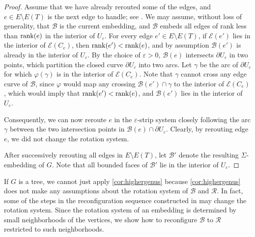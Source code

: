 \documentclass[a4paper,USenglish,cleveref,colorlinks=true,urlcolor=black,linkcolor=black,citecolor=black,thm-restate,authorcolumns]{lipics-v2021}
\theoremstyle{claimstyle}
\begin{document}
\begin{proof}
    Assume that we have already rerouted some of the edges, and $e\in E\setminus E(T)$ is the next edge to handle; see .
    We may assume, without loss of generality, that $\mathcal{B}$ is the current embedding, and $\mathcal{B}$ embeds all edges of rank less than ${\rm rank}(e)$ in the interior of $U_\varepsilon$.
    For every edge $e'\in E\setminus E(T)$, if $\mathcal{E}(e')$
    lies in the interior of $\mathcal{E}(C_e)$, then ${\rm rank}(e')<{\rm rank}(e)$, and by assumption $\mathcal{B}(e')$ is already in the interior of $U_\varepsilon$.
    By the choice of $\varepsilon>0$, $\mathcal{B}(e)$ intersects $\partial U_\varepsilon$ in two points, which partition the closed curve $\partial U_\varepsilon$ into two arcs. Let $\gamma$ be the arc of $\partial U_\varepsilon$ for which $\varphi(\gamma)$ is in the interior of $\mathcal{E}(C_e)$. Note that $\gamma$ cannot cross any edge curve of $\mathcal{B}$, since $\varphi$ would map any crossing $\mathcal{B}(e')\cap \gamma$ to the interior of $\mathcal{E}(C_e)$, which would imply that ${\rm rank}(e')<{\rm rank}(e)$, and $\mathcal{B}(e')$ lies in the interior of $U_\varepsilon$.

    Consequently, we can now reroute $e$ in the $\varepsilon$-strip system closely following the arc $\gamma$ between the two intersection points in $\mathcal{B}(e)\cap \partial U_\varepsilon$. Clearly, by rerouting edge $e$, we did not change the rotation system.

    After successively rerouting all edges in $E\setminus E(T)$, let $\mathcal{B}'$ denote the resulting $\Sigma$-embedding of $G$.
    Note that all bounded faces of $\mathcal{B}'$ lie in the interior of $U_\varepsilon$.
\end{proof}

If $G$ is a tree, we cannot just apply \cref{cor:highergenus} because \cref{cor:highergenus} does not make any assumptions about the rotation system of $\mathcal{B}$ and $\mathcal{R}$.
In fact, some of the steps in the reconfiguration sequence constructed in  may change the rotation system.
Since the rotation system of an embedding is determined by small neighborhoods of the vertices, we show how to reconfigure $\mathcal{B}$ to $\mathcal{R}$ restricted to such neighborhoods.
\end{document}
